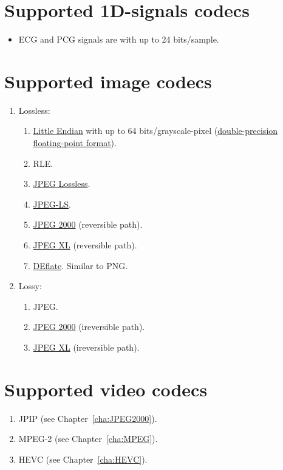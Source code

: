 \section{Supported 1D-signals codecs}
\begin{itemize}
\item \gls{ECG} and \gls{PCG} signals are  with up to 24
  bits/sample.
\end{itemize}

\section{Supported image codecs}
\begin{enumerate}
\item Lossless:
  \begin{enumerate}
  \item {}
    \href{https://en.wikipedia.org/wiki/Endianness}{Little Endian}
    with up to 64 bits/grayscale-pixel
    (\href{https://en.wikipedia.org/wiki/Double-precision_floating-point_format}{double-precision
      floating-point format}).
  \item \gls{RLE}.
  \item \href{https://en.wikipedia.org/wiki/Lossless_JPEG}{JPEG Lossless}.
  \item \href{https://en.wikipedia.org/wiki/Lossless_JPEG\#JPEG_LS}{JPEG-LS}.
  \item \href{https://en.wikipedia.org/wiki/JPEG_2000}{JPEG 2000}
    (reversible path).
  \item \href{https://en.wikipedia.org/wiki/JPEG_XL}{JPEG XL}
    (reversible path).
  \item \href{https://en.wikipedia.org/wiki/Deflate}{DEflate}. Similar
    to \gls{PNG}.
  \end{enumerate}
\item Lossy:
  \begin{enumerate}
  \item \gls{JPEG}.
  \item \href{https://en.wikipedia.org/wiki/JPEG_2000}{JPEG 2000}
    (ireversible path).
  \item \href{https://en.wikipedia.org/wiki/JPEG_XL}{JPEG XL}
    (ireversible path).
  \end{enumerate}
\end{enumerate}

\section{Supported video codecs}
\begin{enumerate}
\item \gls{JPIP} (see Chapter~\ref{cha:JPEG2000}).
\item \gls{MPEG}-2 (see Chapter~\ref{cha:MPEG}).
\item \gls{HEVC} (see Chapter~\ref{cha:HEVC}).
\end{enumerate}

